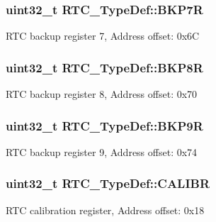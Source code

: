 \subsubsection[{\texorpdfstring{B\+K\+P7R}{BKP7R}}]{ uint32\+\_\+t R\+T\+C\+\_\+\+Type\+Def\+::\+B\+K\+P7R}\hypertarget{struct_r_t_c___type_def_a9934af6ae6b3f5660204d48ceb2f3192}{}\label{struct_r_t_c___type_def_a9934af6ae6b3f5660204d48ceb2f3192}
R\+TC backup register 7, Address offset\+: 0x6C 
\subsubsection[{\texorpdfstring{B\+K\+P8R}{BKP8R}}]{ uint32\+\_\+t R\+T\+C\+\_\+\+Type\+Def\+::\+B\+K\+P8R}\hypertarget{struct_r_t_c___type_def_a0e7fca11f1c953270ee0ee6028860add}{}\label{struct_r_t_c___type_def_a0e7fca11f1c953270ee0ee6028860add}
R\+TC backup register 8, Address offset\+: 0x70 
\subsubsection[{\texorpdfstring{B\+K\+P9R}{BKP9R}}]{ uint32\+\_\+t R\+T\+C\+\_\+\+Type\+Def\+::\+B\+K\+P9R}\hypertarget{struct_r_t_c___type_def_abadf1ac26350bf00575428be6a05708b}{}\label{struct_r_t_c___type_def_abadf1ac26350bf00575428be6a05708b}
R\+TC backup register 9, Address offset\+: 0x74 
\subsubsection[{\texorpdfstring{C\+A\+L\+I\+BR}{CALIBR}}]{ uint32\+\_\+t R\+T\+C\+\_\+\+Type\+Def\+::\+C\+A\+L\+I\+BR}\hypertarget{struct_r_t_c___type_def_a2403d29b2bfffb734ebef6642c0d2724}{}\label{struct_r_t_c___type_def_a2403d29b2bfffb734ebef6642c0d2724}
R\+TC calibration register, Address offset\+: 0x18 
